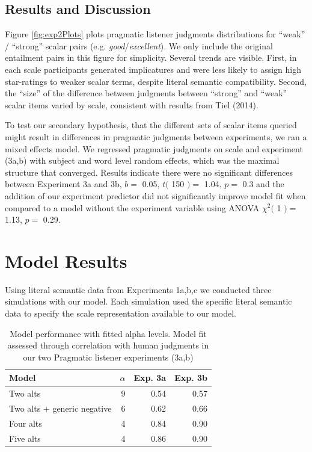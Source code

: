 \documentclass[10pt, letterpaper]{article}
\begin{document}
\subsection{Results and Discussion}\label{results-and-discussion-2}

Figure \ref{fig:exp2Plots} plots pragmatic listener judgments
distributions for ``weak'' / ``strong'' scalar pairs (e.g.
\emph{good}/\emph{excellent}). We only include the original entailment
pairs in this figure for simplicity. Several trends are visible. First,
in each scale participants generated implicatures and were less likely
to assign high star-ratings to weaker scalar terms, despite literal
semantic compatibility. Second, the ``size'' of the difference between
judgments between ``strong'' and ``weak'' scalar items varied by scale,
consistent with results from Tiel (2014).

To test our secondary hypothesis, that the different sets of scalar
items queried might result in differences in pragmatic judgments between
experiments, we ran a mixed effects model. We regressed pragmatic
judgments on scale and experiment (3a,b) with subject and word level
random effects, which was the maximal structure that converged. Results
indicate there were no significant differences between Experiment 3a and
3b, \(b =\) 0.05, \(t(\) 150 \() =\) 1.04, \(p =\) 0.3 and the addition
of our experiment predictor did not significantly improve model fit when
compared to a model without the experiment variable using ANOVA
\(\chi^2(\) 1 \() =\) 1.13, \(p =\) 0.29.

\section{Model Results}\label{model-results}

Using literal semantic data from Experiments 1a,b,c we conducted three
simulations with our model. Each simulation used the specific literal
semantic data to specify the scale representation available to our
model.

\begin{table}[ht]
\centering
\begin{tabular}{lrrr}
  \hline
Model & $\alpha$ & Exp. 3a & Exp. 3b \\ 
  \hline
Two alts &   9 & 0.54 & 0.57 \\ 
  Two alts + generic negative  &   6 & 0.62 & 0.66 \\ 
  Four alts &   4 & 0.84 & 0.90 \\ 
  Five alts &   4 & 0.86 & 0.90 \\ 
   \hline
\end{tabular}
\caption{Model performance with fitted alpha levels. Model fit assessed through correlation with human judgments in our two Pragmatic listener experiments (3a,b)} 
\end{table}
\end{document}
